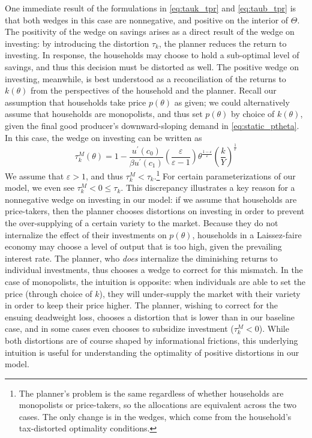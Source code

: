 \documentclass[11pt]{article}
\begin{document}
One immediate result of the formulations in \eqref{eq:tauk_tpr} and \eqref{eq:taub_tpr} is that both wedges in this case are nonnegative, and positive on the interior of \( \Theta \). The positivity of the wedge on savings arises as a direct result of the wedge on investing: by introducing the distortion \( \tau_k \), the planner reduces the return to investing. In response, the households may choose to hold a sub-optimal level of savings, and thus this decision must be distorted as well. The positive wedge on investing, meanwhile, is best understood as a reconciliation of the returns to \( k(\theta) \) from the perspectives of the household and the planner. Recall our assumption that households take price \( p(\theta) \) as given; we could alternatively assume that households are monopolists, and thus set \( p(\theta) \) by choice of \( k(\theta) \), given the final good producer's downward-sloping demand in \eqref{eq:static_ptheta}. In this case, the wedge on investing can be written as 
\begin{equation}
    \tau_k^M(\theta) = 1-\frac{u^{\prime}\left(c_{0}\right)}{\beta u^{\prime}\left(c_{1}\right)}\left(\frac{\varepsilon}{\varepsilon-1}\right)\theta^{\frac{1-\varepsilon}{\varepsilon}}\left(\frac{k}{Y}\right)^{\frac{1}{\varepsilon}}
\end{equation}
We assume that \( \varepsilon > 1 \), and thus \( \tau_k^M < \tau_k \).\footnote{The planner's problem is the same regardless of whether households are monopolists or price-takers, so the allocations are equivalent across the two cases. The only change is in the wedges, which come from the household's tax-distorted optimality conditions.} For certain parameterizations of our model, we even see \( \tau_k^M<0\le\tau_k \). This discrepancy illustrates a key reason for a nonnegative wedge on investing in our model: if we assume that households are price-takers, then the planner chooses distortions on investing in order to prevent the over-supplying of a certain variety to the market. Because they do not internalize the effect of their investments on \( p(\theta) \), households in a Laissez-faire economy may choose a level of output that is too high, given the prevailing interest rate. The planner, who \textit{does} internalize the diminishing returns to individual investments, thus chooses a wedge to correct for this mismatch. In the case of monopolists, the intuition is opposite: when individuals are able to set the price (through choice of \( k \)), they will under-supply the market with their variety in order to keep their price higher. The planner, wishing to correct for the ensuing deadweight loss, chooses a distortion that is lower than in our baseline case, and in some cases even chooses to subsidize investment (\( \tau_k^M<0 \)). While both distortions are of course shaped by informational frictions, this underlying intuition is useful for understanding the optimality of positive distortions in our model. 
\end{document}

